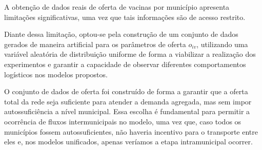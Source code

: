 A obtenção de dados reais de oferta de vacinas por município apresenta limitações significativas, uma vez que tais informações são de acesso restrito. 

Diante dessa limitação, optou-se pela construção de um conjunto de dados gerados de maneira artificial para os parâmetros de oferta $o_{iv}$, utilizando uma variável aleatória de distribuição uniforme de forma a viabilizar a realização dos experimentos e garantir a capacidade de observar diferentes comportamentos logísticos nos modelos propostos.

O conjunto de dados de oferta foi construído de forma a garantir que a oferta total da rede seja suficiente para atender a demanda agregada, mas sem impor autossuficiência a nível municipal. Essa escolha é fundamental para permitir a ocorrência de fluxos intermunicipais no modelo, uma vez que, caso todos os municípios fossem autossuficientes, não haveria incentivo para o transporte entre eles e, nos modelos unificados, apenas veríamos a etapa intramunicipal ocorrer.


    


